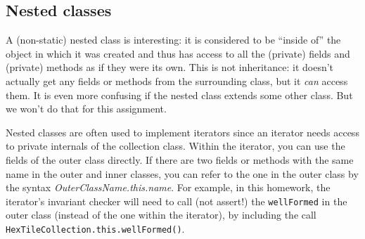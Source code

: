 \documentclass[11pt]{article}
\begin{document}
\subsection{Nested classes}

A (non-static)
nested class is interesting: it is considered to be ``inside of'' the
object in which it was created and thus has access to all the
(private) fields and (private) methods as if they were its own.
This is not inheritance: it doesn't actually get any fields or methods
from the surrounding class, but it \emph{can} access them.
It is even more confusing if the nested class extends some other
class.  But we won't do that for this assignment.

Nested classes are often used to implement iterators since an iterator
needs access to private internals of the collection class.
Within the iterator, you can use the fields of the outer class directly.
If there are two fields or methods with the same name in the outer and inner classes,
you can refer to the one in the outer class by the syntax 
\emph{OuterClassName.this.name}.
For example, in this homework, the iterator's invariant checker will
need to call (not assert!) the \verb|wellFormed| in the outer class
(instead of the one within the iterator), by including the call
\verb|HexTileCollection.this.wellFormed()|.

%
\end{document}
